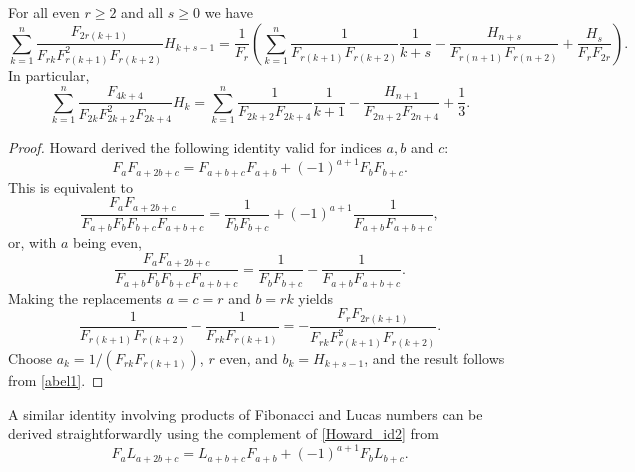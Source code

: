 \documentclass[12pt,reqno]{article}
\begin{document}
	\begin{theorem}\label{thm5_rec}
		For all even $r\geq 2$ and all $s\geq 0$ we have
		\begin{equation}\label{eq1_thm5_rec}
			\sum_{k=1}^n \frac{F_{2r(k+1)}}{F_{rk} F_{r(k+1)}^2 F_{r(k+2)}} H_{k+s-1} = \frac{1}{F_r} \left ( \sum_{k=1}^n \frac{1}{F_{r(k+1)} F_{r(k+2)}}\frac{1}{k+s} - \frac{H_{n+s}}{F_{r(n+1)} F_{r(n+2)}} + \frac{H_s}{F_{r} F_{2r}} \right ).
		\end{equation}
		In particular,
		\begin{equation}
			\sum_{k=1}^n \frac{F_{4k+4}}{F_{2k} F_{2k+2}^2 F_{2k+4}} H_{k} = \sum_{k=1}^n \frac{1}{F_{2k+2} F_{2k+4}}\frac{1}{k+1}
			- \frac{H_{n+1}}{F_{2n+2} F_{2n+4}} + \frac{1}{3}.
		\end{equation}
	\end{theorem}
	\begin{proof}
		Howard \cite{Howard03} derived the following identity valid for indices $a,b$ and $c$:
		\begin{equation}\label{Howard_id2}
			F_a F_{a+2b+c} = F_{a+b+c} F_{a+b} + (-1)^{a+1} F_b F_{b+c}.
		\end{equation}
		This is equivalent to
		\begin{equation*}
			\frac{F_{a} F_{a+2b+c}}{F_{a+b} F_b F_{b+c} F_{a+b+c}} = \frac{1}{F_b F_{b+c}} + (-1)^{a+1} \frac{1}{F_{a+b} F_{a+b+c}},
		\end{equation*}
		or, with $a$ being even,
		\begin{equation*}
			\frac{F_{a} F_{a+2b+c}}{F_{a+b} F_b F_{b+c} F_{a+b+c}} = \frac{1}{F_b F_{b+c}} - \frac{1}{F_{a+b} F_{a+b+c}}.
		\end{equation*}
		Making the replacements $a=c=r$ and $b=rk$ yields
		\begin{equation*}
			\frac{1}{F_{r(k+1)} F_{r(k+2)}} - \frac{1}{F_{rk} F_{r(k+1)}} = - \frac{F_r F_{2r(k+1)}}{F_{rk} F_{r(k+1)}^2 F_{r(k+2)}}.
		\end{equation*}
		Choose $a_k=1/(F_{rk} F_{r(k+1)})$, $r$ even, and $b_k=H_{k+s-1}$, and the result follows from \eqref{abel1}.
	\end{proof}
	
	\begin{remark}
		A similar identity involving products of Fibonacci and Lucas numbers can be derived straightforwardly using the complement
		of \eqref{Howard_id2} from \cite{Howard03}
		\begin{equation}
			F_a L_{a+2b+c} = L_{a+b+c} F_{a+b} + (-1)^{a+1} F_b L_{b+c}.
		\end{equation}
	\end{remark}
	
\end{document}
